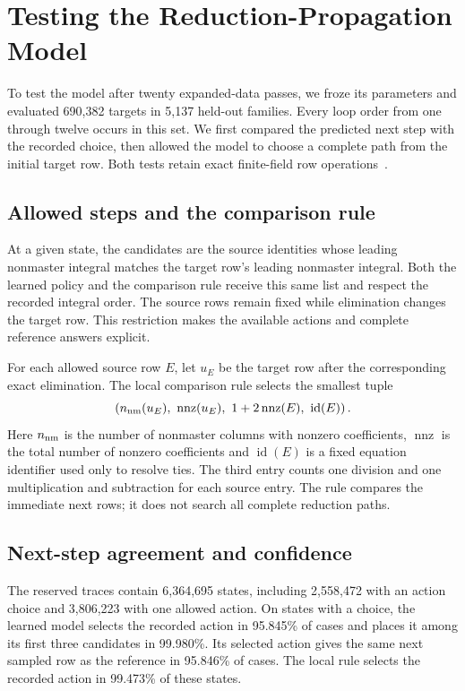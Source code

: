 \section{Testing the Reduction-Propagation Model}
\label{sec:reduction-test}
To test the model after twenty expanded-data passes, we froze its
parameters and evaluated 690,382 targets in 5,137 held-out
families. Every loop order from one through twelve occurs in this
set. We first compared the predicted next step with the recorded
choice, then allowed the model to choose a complete path from the
initial target row. Both tests retain exact finite-field row
operations~\cite{ReductionModelTestData}.

\subsection{Allowed steps and the comparison rule}
At a given state, the candidates are the source identities whose
leading nonmaster integral matches the target row's leading
nonmaster integral. Both the learned policy and the comparison rule
receive this same list and respect the recorded integral order.
The source rows remain fixed while elimination changes the target
row. This restriction makes the available actions and complete
reference answers explicit.

For each allowed source row $E$, let $u_E$ be the target row after
the corresponding exact elimination. The local comparison rule
selects the smallest tuple
\begin{equation}
 \left(n_{\rm nm}(u_E),\
       \operatorname{nnz}(u_E),\
       1+2\operatorname{nnz}(E),\
       \operatorname{id}(E)\right).
 \label{eq:reduction-local-rule}
\end{equation}
Here $n_{\rm nm}$ is the number of nonmaster columns with nonzero
coefficients, $\operatorname{nnz}$ is the total number of nonzero
coefficients and $\operatorname{id}(E)$ is a fixed equation
identifier used only to resolve ties. The third entry counts one
division and one multiplication and subtraction for each source
entry. The rule compares the immediate next rows; it does not search
all complete reduction paths.

\subsection{Next-step agreement and confidence}
The reserved traces contain 6,364,695 states, including
2,558,472 with an action choice and 3,806,223 with one allowed
action. On states with a choice, the learned model selects the
recorded action in 95.845\% of cases and places it among its first
three candidates in 99.980\%. Its selected action gives the same
next sampled row as the reference in 95.846\% of cases.
The local rule selects the recorded action in 99.473\%
of these states.

